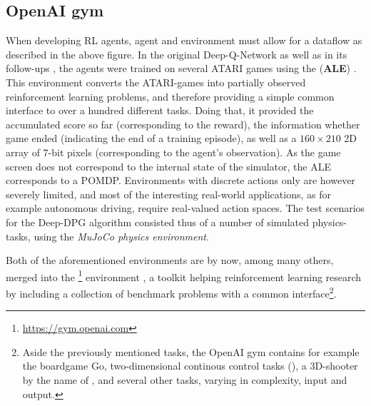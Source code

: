\subsection{OpenAI gym}

When developing RL agents, agent and environment must allow for a dataflow as described in the above figure. In the original Deep-Q-Network \cite{mnih_playing_2013} as well as in its follow-ups \cite{van_hasselt_deep_2015, wang_dueling_2015}, the agents were trained on several ATARI games using the  (\textbf{ALE}) \cite{bellemare_arcade_2012}. This environment converts the ATARI-games into partially observed reinforcement learning problems, and therefore providing a simple common interface to over a hundred different tasks. Doing that, it provided the accumulated score so far (corresponding to the reward), the information whether game ended (indicating the end of a training episode), as well as a $160 \times 210$  2D array of 7-bit pixels (corresponding to the agent's observation). As the game screen does not correspond to the internal state of the simulator, the ALE corresponds to a POMDP. Environments with discrete actions only are however severely limited, and most of the interesting real-world applications, as for example autonomous driving, require real-valued action spaces. The test scenarios for the Deep-DPG algorithm consisted thus of a number of simulated physics-tasks, using the \textit{MuJoCo physics environment}. 

Both of the aforementioned environments are by now, among many others, merged into the \footnote{\url{https://gym.openai.com}} environment \cite{brockman_openai_2016}, a toolkit helping reinforcement learning research by including a collection of benchmark problems with a common interface\footnote{Aside the previously mentioned tasks, the OpenAI gym contains for example the boardgame Go, two-dimensional continous control tasks (), a 3D-shooter by the name of , and several other tasks, varying in complexity, input and output.}.

